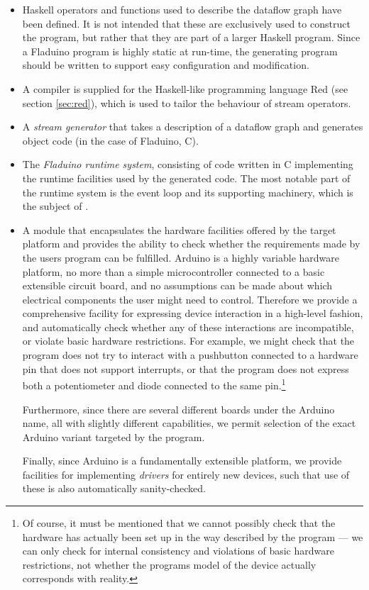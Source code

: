 \documentclass[a4paper, oneside, final]{memoir}
\let\Fref\undefined
\begin{document}
\begin{itemize}
\item Haskell operators and functions used to describe the dataflow
  graph have been defined.  It is not intended that these are
  exclusively used to construct the program, but rather that they are
  part of a larger Haskell program.  Since a Fladuino program is
  highly static at run-time, the generating program should be written
  to support easy configuration and modification.
\item A compiler is supplied for the Haskell-like programming language
  Red (see section \ref{sec:red}), which is used to tailor the
  behaviour of stream operators.
\item A \textit{stream generator} that takes a description of a
  dataflow graph and generates object code (in the case of Fladuino,
  C).
\item The \textit{Fladuino runtime system}, consisting of code written
  in C implementing the runtime facilities used by the generated code.
  The most notable part of the runtime system is the event loop and
  its supporting machinery, which is the subject of
  \Fref{sec:dataflowevaluationstrategy}.
\item A module that encapsulates the hardware facilities offered by
  the target platform and provides the ability to check whether the
  requirements made by the users program can be fulfilled.  Arduino is
  a highly variable hardware platform, no more than a simple
  microcontroller connected to a basic extensible circuit board, and
  no assumptions can be made about which electrical components the
  user might need to control.  Therefore we provide a comprehensive
  facility for expressing device interaction in a high-level fashion,
  and automatically check whether any of these interactions are
  incompatible, or violate basic hardware restrictions.  For example,
  we might check that the program does not try to interact with a
  pushbutton connected to a hardware pin that does not support
  interrupts, or that the program does not express both a
  potentiometer and diode connected to the same pin.\footnote{Of
    course, it must be mentioned that we cannot possibly check that
    the hardware has actually been set up in the way described by the
    program --- we can only check for internal consistency and
    violations of basic hardware restrictions, not whether the
    programs model of the device actually corresponds with reality.}

  Furthermore, since there are several different boards under the
  Arduino name, all with slightly different capabilities, we permit
  selection of the exact Arduino variant targeted by the program.

  Finally, since Arduino is a fundamentally extensible platform, we
  provide facilities for implementing \textit{drivers} for entirely
  new devices, such that use of these is also automatically
  sanity-checked.
\end{itemize}
\end{document}

